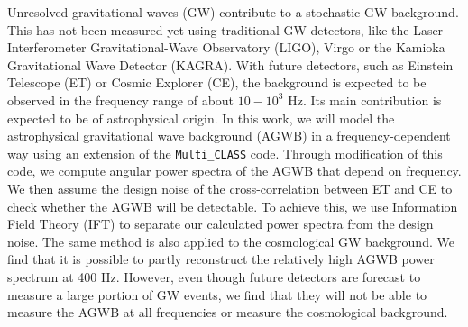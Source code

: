 Unresolved gravitational waves (GW) contribute to a stochastic GW background. This has not been measured yet using traditional GW detectors, like the Laser Interferometer Gravitational-Wave Observatory (LIGO), Virgo or the Kamioka Gravitational Wave Detector (KAGRA). With future detectors, such as Einstein Telescope (ET) or Cosmic Explorer (CE), the background is expected to be observed in the frequency range of about $ 10-10^3$ Hz. Its main contribution is expected to be of astrophysical origin. In this work, we will model the astrophysical gravitational wave background (AGWB) in a frequency-dependent way using an extension of the {\tt Multi\_CLASS} code. Through modification of this code, we compute angular power spectra of the AGWB that depend on frequency. We then assume the design noise of the cross-correlation between ET and CE to check whether the AGWB will be detectable. To achieve this, we use Information Field Theory (IFT) to separate our calculated power spectra from the design noise. The same method is also applied to the cosmological GW background. We find that it is possible to partly reconstruct the relatively high AGWB power spectrum at 400 Hz. However, even though future detectors are forecast to measure a large portion of GW events, we find that they will not be able to measure the AGWB at all frequencies or measure the cosmological background.
